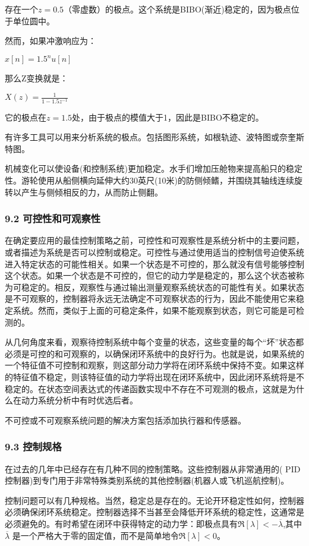 存在一个$z = 0.5$（零虚数）的极点。这个系统是BIBO(渐近)稳定的，因为极点位于单位圆中。

然而，如果冲激响应为：

$x[n] = 1.5^n u[n]$

那么Z变换就是：

$ X(z) = \frac{1}{1 - 1.5z^{-1}} $

它的极点在$z = 1.5$处，由于极点的模值大于1，因此是BIBO不稳定的。

有许多工具可以用来分析系统的极点。包括图形系统，如根轨迹、波特图或奈奎斯特图。

机械变化可以使设备(和控制系统)更加稳定。水手们增加压舱物来提高船只的稳定性。游轮使用从船侧横向延伸大约30英尺(10米)的防侧倾鳍，并围绕其轴线连续旋转以产生与侧倾相反的力，从而防止侧翻。

\subsubsection{9.2 可控性和可观察性}

在确定要应用的最佳控制策略之前，可控性和可观察性是系统分析中的主要问题，或者描述为系统是否可以控制或稳定。可控性与通过使用适当的控制信号迫使系统进入特定状态的可能性相关。如果一个状态是不可控的，那么就没有信号能够控制这个状态。如果一个状态是不可控的，但它的动力学是稳定的，那么这个状态被称为可稳定的。相反，观察性与通过输出测量观察系统状态的可能性有关。如果状态是不可观察的，控制器将永远无法确定不可观察状态的行为，因此不能使用它来稳定系统。然而，类似于上面的可稳定条件，如果不能观察到状态，则它可能是可检测的。

从几何角度来看，观察待控制系统中每个变量的状态，这些变量的每个“坏”状态都必须是可控的和可观察的，以确保闭环系统中的良好行为。也就是说，如果系统的一个特征值不可控制和观察，则这部分动力学将在闭环系统中保持不变。如果这样的特征值不稳定，则该特征值的动力学将出现在闭环系统中，因此闭环系统将是不稳定的。在状态空间表达式的传递函数实现中不存在不可观测的极点，这就是为什么在动力系统分析中有时优选后者。

不可控或不可观察系统问题的解决方案包括添加执行器和传感器。

\subsubsection{9.3 控制规格}

在过去的几年中已经存在有几种不同的控制策略。这些控制器从非常通用的( PID控制器)到专门用于非常特殊类别系统的其他控制器(机器人或飞机巡航控制)。

控制问题可以有几种规格。当然，稳定总是存在的。无论开环稳定性如何，控制器必须确保闭环系统稳定。控制器选择不当甚至会降低开环系统的稳定性，这通常是必须避免的。有时希望在闭环中获得特定的动力学：即极点具有$\Re[\lambda] < -\overline{\lambda}$,其中$\overline{\lambda}$ 是一个严格大于零的固定值，而不是简单地令$\Re[\lambda] < 0$。


